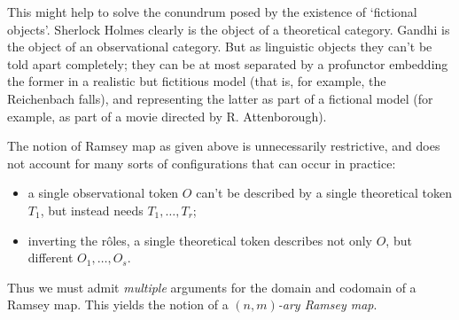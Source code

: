 This might help to solve the conundrum posed by the existence of `fictional objects'. Sherlock Holmes clearly is the object of a theoretical category. Gandhi is the object of an observational category. But as linguistic objects they can't be told apart completely; they can be at most separated by a profunctor embedding the former in a realistic but fictitious model (that is, for example, the Reichenbach falls), and representing the latter as part of a fictional model (for example, as part of a movie directed by R. Attenborough).

The notion of Ramsey map as given above is unnecessarily restrictive, and does not account for many sorts of configurations that can occur in practice:
\begin{itemize}
  \item a single observational token $O$ can't be described by a single theoretical token $T_1$, but instead needs $T_1,\dots,T_r$;
  \item inverting the r\^oles, a single theoretical token describes not only $O$, but different $O_1,\dots,O_s$.
\end{itemize}
Thus we must admit \emph{multiple} arguments for the domain and codomain of a Ramsey map. This yields the notion of a \emph{$(n,m)$-ary Ramsey map}.
